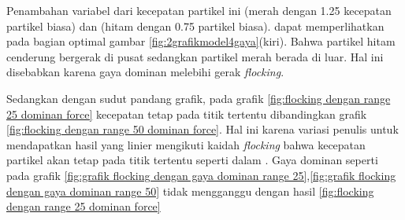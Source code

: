 Penambahan variabel dari kecepatan partikel ini (merah dengan 1.25 kecepatan partikel biasa) dan (hitam dengan 0.75 partikel biasa). dapat memperlihatkan pada bagian optimal gambar  \ref{fig:2grafikmodel4gaya}(kiri). Bahwa partikel hitam cenderung bergerak di pusat sedangkan partikel merah berada di luar. Hal ini disebabkan karena gaya dominan melebihi gerak \textit{flocking}.

\hspace{0.6cm}Sedangkan dengan sudut pandang grafik, pada grafik \ref{fig:flocking dengan range 25 dominan force} kecepatan tetap pada titik tertentu dibandingkan grafik \ref{fig:flocking dengan range 50 dominan force}. Hal ini karena variasi penulis untuk mendapatkan hasil yang linier mengikuti kaidah \textit{flocking} bahwa kecepatan partikel akan tetap pada titik tertentu seperti dalam \citep{Bajec2007}. Gaya dominan seperti pada grafik \ref{fig:grafik flocking dengan gaya dominan range 25},\ref{fig:grafik flocking dengan gaya dominan range 50} tidak mengganggu dengan hasil \ref{fig:flocking dengan range 25 dominan force}

